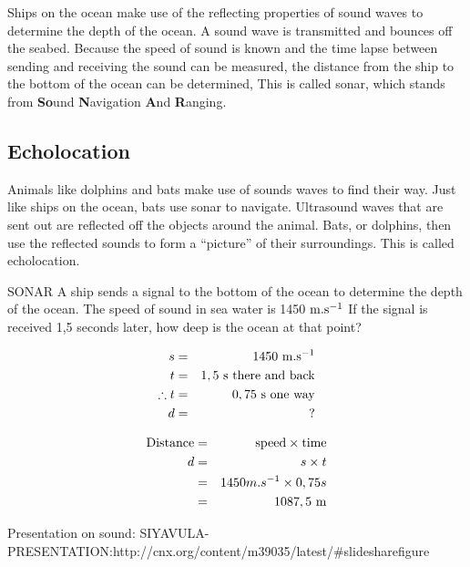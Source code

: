 Ships on the ocean make use of the reflecting properties of sound waves to determine the depth of the ocean. A sound wave is transmitted and bounces off the seabed. Because the speed of sound is known and the time lapse between sending and receiving the sound can be measured, the distance from the ship to the bottom of the ocean can be determined, This is called sonar, which stands from \textbf{So}und \textbf{N}avigation \textbf{A}nd \textbf{R}anging.

\subsection{Echolocation}
Animals like dolphins and bats make use of sounds waves to find their way. Just like ships on the ocean, bats use sonar to navigate. Ultrasound waves that are sent out are reflected off the objects around the animal. Bats, or dolphins, then use the reflected sounds to form a ``picture'' of their surroundings. This is called echolocation.

\begin{wex}{SONAR}
{A ship sends a signal to the bottom of the ocean to determine the depth of the ocean. The speed of sound in sea water is 1450 $\rm{m.s^{-1}}$ If the signal is received 1,5 seconds later, how deep is the ocean at that point?}
{
\begin{eqnarray*}
s &=& 1450 \ \rm{m.s^{-1}}\\
t &=& 1,5 \ \rm{s} \ \rm{there \ and \ back}\\
\therefore t &= & 0,75 \ \rm{s} \ \rm{one \ way}\\
d &=& ?
\end{eqnarray*}

\begin{eqnarray*}
\rm{Distance} &=& \rm{speed} \times \rm{time} \\
d &=& s \times t \\
&=& 1450 m.s^{-1} \times 0,75 s \\
&=& 1087,5 \ \rm{m}
\end{eqnarray*}

}
\end{wex}

Presentation on sound: SIYAVULA-PRESENTATION:http://cnx.org/content/m39035/latest/#slidesharefigure

